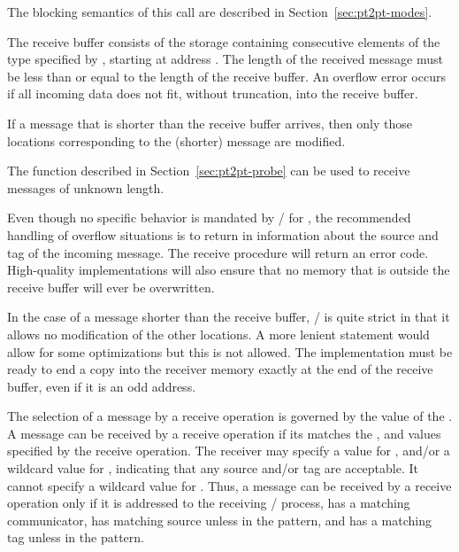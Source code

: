 The blocking semantics of this call are described in Section~\ref{sec:pt2pt-modes}.

The receive buffer consists of
the storage containing  consecutive elements of the type
specified by , starting at address .
The length of the received message must be less than or equal to the length of
the receive buffer. An overflow error occurs if all incoming data does
not fit, without truncation, into the receive buffer.

If a
message that is shorter than the receive buffer arrives, then only those
locations corresponding to the (shorter) message are modified.

\begin{users}
The  function described in
Section~\ref{sec:pt2pt-probe} can be used to receive messages of
unknown length.
\end{users}

\begin{implementors}
Even though no specific behavior is mandated by \MPI/ for , the
recommended handling of overflow situations is to return in
 information about the
source and tag of the incoming message.  The receive procedure will return an
error code.  High-quality implementations will also ensure that no memory
that is outside the receive buffer will ever be overwritten.

In the case of a message shorter than the receive buffer, \MPI/ is
quite strict in that it allows no modification of the other locations.
A more lenient statement would allow for some
optimizations but this is not allowed.  The implementation must be ready to
end a copy into the receiver memory exactly at the end of the receive
buffer, even if it is an odd address.
\end{implementors}


The selection of a message by a receive operation is governed by
the value of the .
A message can be received by a receive operation
if its  matches the ,  and
 values specified by the
receive operation.  The receiver may specify a 
value for , and/or
a wildcard 
value for ,
indicating that any source and/or tag are acceptable.  It cannot specify a
wildcard value for .
Thus, a message can be received by a receive
operation only if it is addressed
to the receiving \MPI/ process, has a matching communicator, has
matching source unless
\mpicode{ = }
in the pattern, and has a matching tag unless
\mpicode{ = }
in the pattern.

